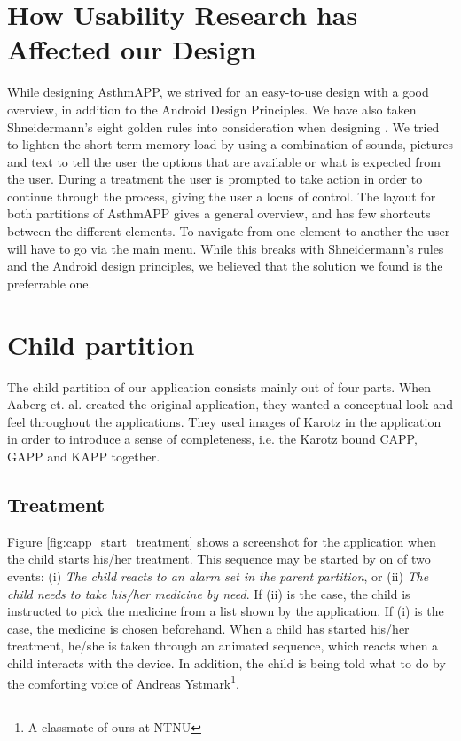 \section{How Usability Research has Affected our Design}
\label{sec:usability-affect-design}
While designing AsthmAPP, we strived for an easy-to-use design with a good overview, in addition to the Android Design Principles\cite{androiddesign}. We have also taken Shneidermann's eight golden rules into consideration when designing \app{}\cite{shneiderman2003designing}. 
We tried to lighten the short-term memory load by using a combination of sounds, pictures and text to tell the user the options that are available or what is expected from the user. During a treatment the user is prompted to take action in order to continue through the process, giving the user a locus of control. 
The layout for both partitions of AsthmAPP gives a general overview, and has few shortcuts between the different elements. To navigate from one element to another the user will have to go via the main menu. While this breaks with Shneidermann's rules and the Android design principles, we believed that the solution we found is the preferrable one.


\section{Child partition}
\label{sec:description-child-partition}
The child partition of our application consists mainly out of four parts. When Aaberg et. al. created the original application, they wanted a conceptual look and feel throughout the applications. They used images of Karotz in the application in order to introduce a sense of completeness, i.e. the Karotz bound CAPP, GAPP and KAPP together. 

\subsection{Treatment}
\label{sec:sec:description-treatment}
Figure \ref{fig:capp_start_treatment} shows a screenshot for the application when the child starts his/her treatment. This sequence may be started by on of two events: (i) \emph{The child reacts to an alarm set in the parent partition}, or (ii) \emph{The child needs to take his/her medicine by need}. If (ii) is the case, the child is instructed to pick the medicine from a list shown by the application. If (i) is the case, the medicine is chosen beforehand. When a child has started his/her treatment, he/she is taken through an animated sequence, which reacts when a child interacts with the device. In addition, the child is being told what to do by the comforting voice of Andreas Ystmark\footnote{A classmate of ours at NTNU}.  



